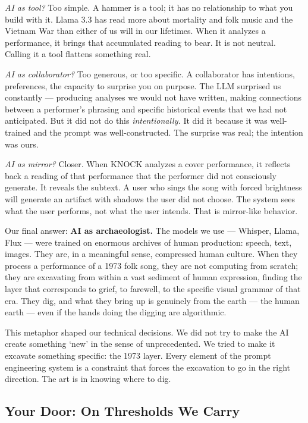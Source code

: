 \documentclass[12pt, a4paper]{article}
\begin{document}
\textit{AI as tool?} Too simple. A hammer is a tool; it has no relationship to what
you build with it. Llama 3.3 has read more about mortality and folk music and the
Vietnam War than either of us will in our lifetimes. When it analyzes a performance,
it brings that accumulated reading to bear. It is not neutral. Calling it a tool
flattens something real.

\textit{AI as collaborator?} Too generous, or too specific. A collaborator has
intentions, preferences, the capacity to surprise you on purpose. The LLM surprised
us constantly --- producing analyses we would not have written, making connections
between a performer's phrasing and specific historical events that we had not
anticipated. But it did not do this \textit{intentionally.} It did it because it was
well-trained and the prompt was well-constructed. The surprise was real; the intention
was ours.

\textit{AI as mirror?} Closer. When KNOCK analyzes a cover performance, it reflects
back a reading of that performance that the performer did not consciously generate.
It reveals the subtext. A user who sings the song with forced brightness will generate
an artifact with shadows the user did not choose. The system sees what the user
performs, not what the user intends. That is mirror-like behavior.

Our final answer: \textbf{AI as archaeologist.} The models we use --- Whisper, Llama,
Flux --- were trained on enormous archives of human production: speech, text, images.
They are, in a meaningful sense, compressed human culture. When they process a
performance of a 1973 folk song, they are not computing from scratch; they are
excavating from within a vast sediment of human expression, finding the layer that
corresponds to grief, to farewell, to the specific visual grammar of that era. They
dig, and what they bring up is genuinely from the earth --- the human earth --- even
if the hands doing the digging are algorithmic.

This metaphor shaped our technical decisions. We did not try to make the AI create
something `new' in the sense of unprecedented. We tried to make it excavate something
specific: the 1973 layer. Every element of the prompt engineering system is a
constraint that forces the excavation to go in the right direction. The art is in
knowing where to dig.

\subsection{Your Door: On Thresholds We Carry}
\end{document}
